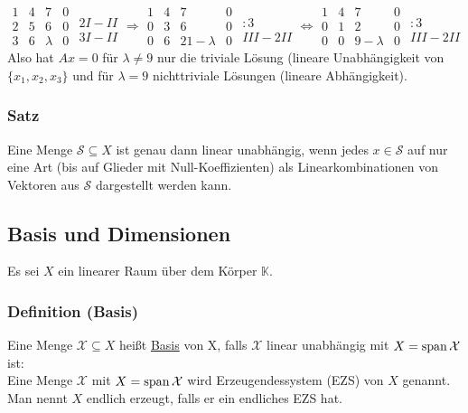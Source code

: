 \begin{enumerate}
\[\begin{array}{ccc|c}1 & 4 & 7 & 0\\ 2 & 5 & 6 & 0\\ 3 & 6 & \lambda&0 \end{array}\begin{matrix}\\ 2I-II\\ 3I-II\end{matrix} \Rightarrow \begin{array}{ccc|c}1 & 4 & 7 & 0\\ 0 & 3 & 6 & 0\\ 0 & 6 & 21 - \lambda & 0 \end{array}\begin{matrix}\\ :3\\ III-2II\end{matrix} \Leftrightarrow \begin{array}{ccc|c}1 & 4 & 7 & 0\\ 0 & 1 & 2 & 0\\ 0 & 0 & 9 - \lambda & 0 \end{array}\begin{matrix}\\ :3\\ III-2II\end{matrix}\]
Also hat $Ax=0$ für $\lambda \not= 9$ nur die triviale Lösung (lineare Unabhängigkeit von $\{x_1,x_2,x_3\}$ und für $\lambda = 9$ nichttriviale Lösungen (lineare Abhängigkeit).
\end{enumerate}
\subsubsection{Satz}
Eine Menge $\mathcal{S}\subseteq X$ ist genau dann linear unabhängig, wenn jedes $x\in\mathcal{S}$ auf nur eine Art (bis auf Glieder mit Null-Koeffizienten) als Linearkombinationen von Vektoren aus $\mathcal{S}$ dargestellt werden kann.
\subsection{Basis und Dimensionen}
Es sei $X$ ein linearer Raum über dem Körper $\mathbb{K}$.
\subsubsection{Definition (Basis)}
Eine Menge $\mathcal{X}\subseteq X$ heißt \underline{Basis} von X, falls $\mathcal{X}$ linear unabhängig mit $X=\operatorname{span}\mathcal{X}$ ist:\\
Eine Menge $\mathcal{X}$ mit $X=\operatorname{span}\mathcal{X}$ wird Erzeugendessystem (EZS) von $X$ genannt.  Man nennt $X$ endlich erzeugt, falls er ein endliches EZS hat.
